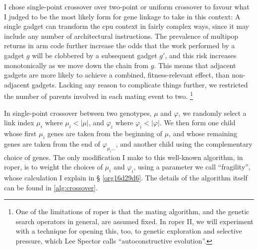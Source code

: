 \documentclass[12pt,glossary]{dalthesis}
\begin{document}
I chose single-point crossover over two-point or uniform crossover to favour
what I judged to be the most likely form for gene linkage to take in this
context: A single gadget can transform the \gls{cpu} context in fairly complex
ways, since it may include any number of architectural instructions. The
prevalence of multipop returns in \gls{arm} code further increase the odds that
the work performed by a gadget \(g\) will be clobbered by a subsequent gadget
\(g'\), and this risk increases monotonically as we move down the chain from \(g\).
This means that adjacent gadgets are more likely to achieve a combined,
fitness-relevant effect, than non-adjacent gadgets. Lacking any reason to
complicate things further, we restricted the number of parents involved in each
mating event to two. \footnote{One of the limitations of \gls{roper} is that the mating
algorithm, and the genetic search operators in general, are assumed fixed. In
\gls{roper} II, we will experiment with a technique for opening this, too, to
genetic exploration and selective pressure, which Lee Spector calls
``autoconstructive evolution''.}


In single-point crossover between two genotypes, \(\mu\) and \(\varphi\), we
randomly select a link index \(\mu_i\) where \(\mu_i < |\mu|\), and \(\varphi_i\)
where \(\varphi_i < |\varphi|\). We then form one child whose first \(\mu_i\) genes
are taken from the beginning of \(\mu\), and whose remaining genes are taken from
the end of \(\varphi_{\mu_i\dots}\), and another child using the complementary
choice of genes. The only modification I make to this well-known algorithm, in
\gls{roper}, is to weight the choices of \(\mu_i\) and \(\varphi_i\), using a
parameter we call ``fragility'', whose calculation I explain in \S
\ref{org16d29d6}. The details of the algorithm itself can be found in
\ref{alg:crossover}.
\end{document}
